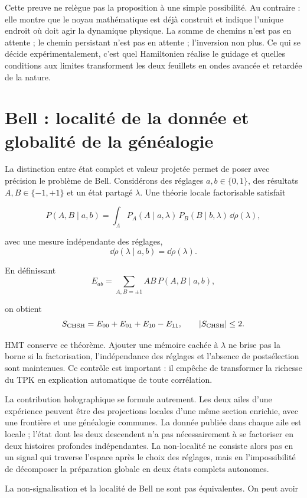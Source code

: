 Cette preuve ne relègue pas la proposition à une simple possibilité. Au contraire : elle montre
que le noyau mathématique est déjà construit et indique l'unique endroit où doit
agir la dynamique physique. La somme de chemins n'est pas en attente ; le chemin persistant
n'est pas en attente ; l'inversion non plus. Ce qui se décide expérimentalement, c'est quel
Hamiltonien réalise le guidage et quelles conditions aux limites transforment les deux feuillets
en ondes avancée et retardée de la nature.

\section{Bell : localité de la donnée et globalité de la généalogie}

La distinction entre état complet et valeur projetée permet de poser avec
précision le problème de Bell. Considérons des réglages \(a,b\in\{0,1\}\), des résultats
\(A,B\in\{-1,+1\}\) et un état partagé \(\lambda\). Une théorie locale
factorisable satisfait

\[
  P(A,B\mid a,b)
  =
  \int_\Lambda
  P_A(A\mid a,\lambda)\,
  P_B(B\mid b,\lambda)\,
  \dd\rho(\lambda),
\]

avec une mesure indépendante des réglages,
\[
  \dd\rho(\lambda\mid a,b)=\dd\rho(\lambda).
\]

En définissant
\[
  E_{ab}
  =
  \sum_{A,B=\pm1}AB\,P(A,B\mid a,b),
\]

on obtient
\[
  S_{\rm CHSH}=E_{00}+E_{01}+E_{10}-E_{11},
  \qquad |S_{\rm CHSH}|\leq2.
\]

HMT conserve ce théorème. Ajouter une mémoire cachée à \(\lambda\) ne brise pas la borne si
la factorisation, l'indépendance des réglages et l'absence de
postsélection sont maintenues. Ce contrôle est important : il empêche de transformer la richesse du TPK en
explication automatique de toute corrélation.

La contribution holographique se formule autrement. Les deux ailes d'une expérience
peuvent être des projections locales d'une même section enrichie, avec une frontière et une
généalogie communes. La donnée publiée dans chaque aile est locale ; l'état dont les deux
descendent n'a pas nécessairement à se factoriser en deux histoires profondes indépendantes.
La non-localité ne consiste alors pas en un signal qui traverse l'espace après le
choix des réglages, mais en l'impossibilité de décomposer la préparation globale
en deux états complets autonomes.

La non-signalisation et la localité de Bell ne sont pas équivalentes. On peut avoir

